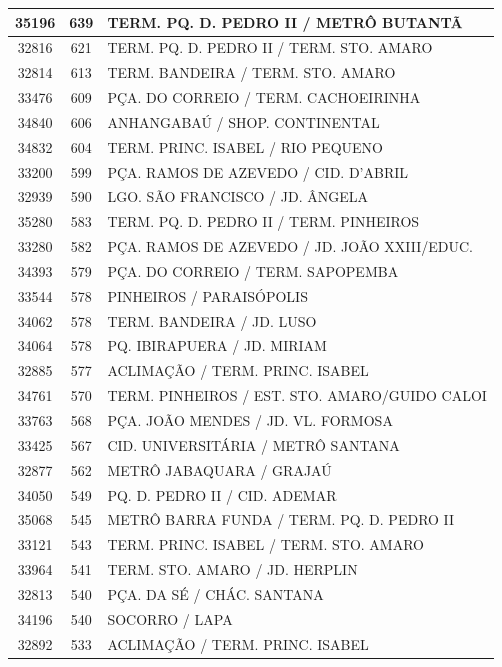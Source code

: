 \documentclass[
	12pt,				%
	oneside,			%
	a4paper,			%
	english,			%
	brazil				%
	]{abntex2ppgsi}
\begin{document}
\begin{apendicesenv}
\begin{longtable}{c|c|p{7cm}}
\hline
    35196 & 639   & TERM. PQ. D. PEDRO II / METRÔ BUTANTÃ \\
\hline
    32816 & 621   & TERM. PQ. D. PEDRO II / TERM. STO. AMARO \\
\hline
    32814 & 613   & TERM. BANDEIRA / TERM. STO. AMARO \\
\hline
    33476 & 609   & PÇA. DO CORREIO / TERM. CACHOEIRINHA \\
\hline
    34840 & 606   & ANHANGABAÚ / SHOP. CONTINENTAL \\
\hline
    34832 & 604   & TERM. PRINC. ISABEL / RIO PEQUENO \\
\hline
    33200 & 599   & PÇA. RAMOS DE AZEVEDO / CID. D'ABRIL \\
\hline
    32939 & 590   & LGO. SÃO FRANCISCO / JD. ÂNGELA \\
\hline
    35280 & 583   & TERM. PQ. D. PEDRO II / TERM. PINHEIROS \\
\hline
    33280 & 582   & PÇA. RAMOS DE AZEVEDO / JD. JOÃO XXIII/EDUC. \\
\hline
    34393 & 579   & PÇA. DO CORREIO / TERM. SAPOPEMBA \\
\hline
    33544 & 578   & PINHEIROS / PARAISÓPOLIS \\
\hline
    34062 & 578   & TERM. BANDEIRA / JD. LUSO \\
\hline
    34064 & 578   & PQ. IBIRAPUERA / JD. MIRIAM \\
\hline
    32885 & 577   & ACLIMAÇÃO / TERM. PRINC. ISABEL \\
\hline
    34761 & 570   & TERM. PINHEIROS / EST. STO. AMARO/GUIDO CALOI \\
\hline
    33763 & 568   & PÇA. JOÃO MENDES / JD. VL. FORMOSA \\
\hline
    33425 & 567   & CID. UNIVERSITÁRIA / METRÔ SANTANA \\
\hline
    32877 & 562   & METRÔ JABAQUARA / GRAJAÚ \\
\hline
    34050 & 549   & PQ. D. PEDRO II / CID. ADEMAR \\
\hline
    35068 & 545   & METRÔ BARRA FUNDA / TERM. PQ. D. PEDRO II \\
\hline
    33121 & 543   & TERM. PRINC. ISABEL / TERM. STO. AMARO \\
\hline
    33964 & 541   & TERM. STO. AMARO / JD. HERPLIN \\
\hline
    32813 & 540   & PÇA. DA SÉ / CHÁC. SANTANA \\
\hline
    34196 & 540   & SOCORRO / LAPA \\
\hline
    32892 & 533   & ACLIMAÇÃO / TERM. PRINC. ISABEL \\

\end{longtable}
\end{apendicesenv}
\end{document}
